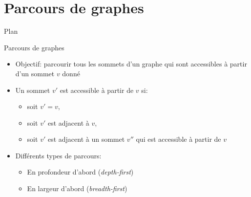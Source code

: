 \section{Parcours de graphes}

\begin{frame}{Plan}

\tableofcontents[currentsection]

\end{frame}

\begin{frame}{Parcours de graphes}
\begin{itemize}
\item Objectif: parcourir tous les sommets d'un graphe qui sont
  accessibles à partir d'un sommet $v$ donné
\item Un sommet $v'$ est accessible à partir de $v$ si:
\begin{itemize}
\item soit $v'=v$,
\item soit $v'$ est adjacent à $v$,
\item soit $v'$ est adjacent à un sommet $v''$ qui est accessible à partir de $v$
\end{itemize}

\bigskip

\item Différents types de parcours:
\begin{itemize}
\item En profondeur d'abord ({\it depth-first})
\item En largeur d'abord ({\it breadth-first})
\end{itemize}
\end{itemize}

\end{frame}

